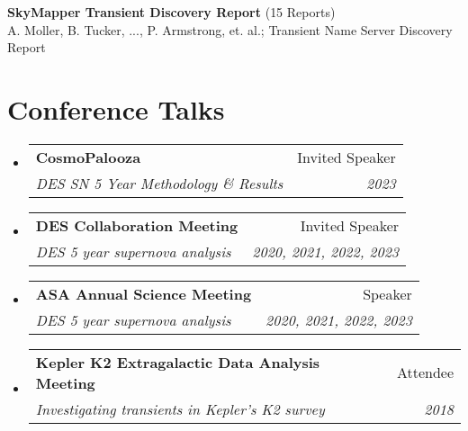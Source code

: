 \documentclass[letterpaper,11pt]{article}
\makeatletter
\newcommand*\lbreak{\\[\baselineskip]}
\newcommand{\resumeItem}[1]{
  \item\small{
    {#1 \vspace{-2pt}}
  }
}
\newcommand{\resumeSubheading}[4]{
  \vspace{-2pt}\item
    \begin{tabular*}{0.97\textwidth}[t]{l@{\extracolsep{\fill}}r}
      \textbf{#1} & #2 \\
      \textit{\small#3} & \textit{\small #4} \\
    \end{tabular*}\vspace{-7pt}
}
\newcommand{\resumeSubHeadingListStart}{\begin{itemize}[leftmargin=0.15in, label={}]}
\newcommand{\resumeSubHeadingListEnd}{\end{itemize}}
\newcommand{\resumeItemListStart}{\begin{itemize}}
\newcommand{\resumeItemListEnd}{\end{itemize}\vspace{-5pt}}
\newcommand{\conferenceElement}[5]{%
    \resumeSubHeadingListStart
        \resumeSubheading
            {#1}
            {#2}
            {#3}
            {#4}
            \ifthenelse{\isempty{#5}}{}{%
                \resumeItemListStart
                    \renewcommand*{\do}[1]{\resumeItem{##1}}
                    \docsvlist{#5}%
                \resumeItemListEnd
            }%
    \resumeSubHeadingListEnd
}
\newcommand{\publicationElement}[5]{%
    \textbf{{#1}} ({#4})\\{#3}; {#2}\lbreak{}
}
\makeatother
\begin{document}
        \publicationElement{SkyMapper Transient Discovery Report}{Transient Name Server Discovery Report}{A. Moller, B. Tucker, ..., P. Armstrong, et. al.}{15 Reports}{2018-05-23: bibcode: \href{https://ui.adsabs.harvard.edu/abs/2018TNSTR.698....1M/abstract}{\underline{2018TNSTR.698....1M}}, 2017-09-06: bibcode: \href{https://ui.adsabs.harvard.edu/abs/2017TNSTR.974....1M/abstract}{\underline{2017TNSTR.974....1M}}, 2017-08-01: bibcode: \href{https://ui.adsabs.harvard.edu/abs/2017TNSTR.827....1M/abstract}{\underline{2017TNSTR.827....1M}}, 2017-08-02: bibcode: \href{https://ui.adsabs.harvard.edu/abs/2017TNSTR.832....1M/abstract}{\underline{2017TNSTR.832....1M}}, 2017-08-03: bibcode: \href{https://ui.adsabs.harvard.edu/abs/2017TNSTR.837....1M/abstract}{\underline{2017TNSTR.837....1M}}, 2017-08-07: bibcode: \href{https://ui.adsabs.harvard.edu/abs/2017TNSTR.851....1M/abstract}{\underline{2017TNSTR.851....1M}}, 2017-08-08: bibcode: \href{https://ui.adsabs.harvard.edu/abs/2017TNSTR.854....1M/abstract}{\underline{2017TNSTR.854....1M}}, 2017-08-22: bibcode: \href{https://ui.adsabs.harvard.edu/abs/2017TNSTR.899....1M/abstract}{\underline{2017TNSTR.899....1M}}, 2017-08-23: bibcode: \href{https://ui.adsabs.harvard.edu/abs/2017TNSTR.904....1M/abstract}{\underline{2017TNSTR.904....1M}}, 2017-08-27: bibcode: \href{https://ui.adsabs.harvard.edu/abs/2017TNSTR.923....1M/abstract}{\underline{2017TNSTR.923....1M}}, 2017-08-28: bibcode: \href{https://ui.adsabs.harvard.edu/abs/2017TNSTR.927....1M/abstract}{\underline{2017TNSTR.927....1M}}, 2017-08-30: bibcode: \href{https://ui.adsabs.harvard.edu/abs/2017TNSTR.934....1M/abstract}{\underline{2017TNSTR.934....1M}}, 2017-05-19: bibcode: \href{https://ui.adsabs.harvard.edu/abs/2017TNSTR.568....1M/abstract}{\underline{2017TNSTR.568....1M}}, 2017-05-23: bibcode: \href{https://ui.adsabs.harvard.edu/abs/2017TNSTR.582....1M/abstract}{\underline{2017TNSTR.582....1M}}, 2017-05-25: bibcode: \href{https://ui.adsabs.harvard.edu/abs/2017TNSTR.593....1M/abstract}{\underline{2017TNSTR.593....1M}}}

\section{Conference Talks}

    \conferenceElement{CosmoPalooza}{Invited Speaker}{DES SN 5 Year Methodology \& Results}{2023}{}
    \conferenceElement{DES Collaboration Meeting}{Invited Speaker}{DES 5 year supernova analysis}{2020, 2021, 2022, 2023}{}
    \conferenceElement{ASA Annual Science Meeting}{Speaker}{DES 5 year supernova analysis}{2020, 2021, 2022, 2023}{}
    \conferenceElement{Kepler K2 Extragalactic Data Analysis Meeting}{Attendee}{Investigating transients in Kepler's K2 survey}{2018}{}
\end{document}
